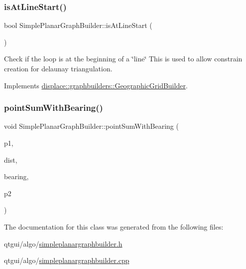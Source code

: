 \subsubsection{\texorpdfstring{isAtLineStart()}{isAtLineStart()}}
{\footnotesize\ttfamily bool Simple\+Planar\+Graph\+Builder\+::is\+At\+Line\+Start (\begin{DoxyParamCaption}{ }\end{DoxyParamCaption})\hspace{0.3cm}{\ttfamily [virtual]}}



Check if the loop is at the beginning of a \char`\"{}line\char`\"{} This is used to allow constrain creation for delaunay triangulation. 



Implements \mbox{\hyperlink{classdisplace_1_1graphbuilders_1_1_geographic_grid_builder_ac04ab8be97b357bb12f9745a012f6a5f}{displace\+::graphbuilders\+::\+Geographic\+Grid\+Builder}}.

\mbox{\label{classdisplace_1_1graphbuilders_1_1_simple_planar_graph_builder_a2a90e60a8dcb81099af96e1528848e4b}} 
\subsubsection{\texorpdfstring{pointSumWithBearing()}{pointSumWithBearing()}}
{\footnotesize\ttfamily void Simple\+Planar\+Graph\+Builder\+::point\+Sum\+With\+Bearing (\begin{DoxyParamCaption}\item[{const Q\+PointF \&}]{p1,  }\item[{double}]{dist,  }\item[{double}]{bearing,  }\item[{Q\+PointF \&}]{p2 }\end{DoxyParamCaption})\hspace{0.3cm}{\ttfamily [protected]}}



The documentation for this class was generated from the following files\+:\begin{DoxyCompactItemize}
\item 
qtgui/algo/\mbox{\hyperlink{simpleplanargraphbuilder_8h}{simpleplanargraphbuilder.\+h}}\item 
qtgui/algo/\mbox{\hyperlink{simpleplanargraphbuilder_8cpp}{simpleplanargraphbuilder.\+cpp}}\end{DoxyCompactItemize}
